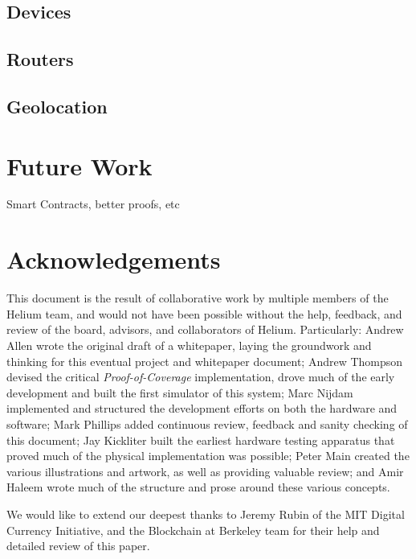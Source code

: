 \documentclass[a4paper,12pt]{article}
\begin{document}
\subsection{Devices}

\subsection{Routers}

\subsection{Geolocation}

\section{Future Work}

Smart Contracts, better proofs, etc

\newpage

\section{Acknowledgements}

This document is the result of collaborative work by multiple members of the Helium team, and would not have been possible without the help, feedback, and review of the board, advisors, and collaborators of Helium. Particularly: Andrew Allen wrote the original draft of a whitepaper, laying the groundwork and thinking for this eventual project and whitepaper document; Andrew Thompson devised the critical \textit{Proof-of-Coverage} implementation, drove much of the early development and built the first simulator of this system; Marc Nijdam implemented and structured the development efforts on both the hardware and software; Mark Phillips added continuous review, feedback and sanity checking of this document; Jay Kickliter built the earliest hardware testing apparatus that proved much of the physical implementation was possible; Peter Main created the various illustrations and artwork, as well as providing valuable review; and Amir Haleem wrote much of the structure and prose around these various concepts.\newline

We would like to extend our deepest thanks to Jeremy Rubin of the MIT Digital Currency Initiative, and the Blockchain at Berkeley team for their help and detailed review of this paper.\newline
\end{document}
